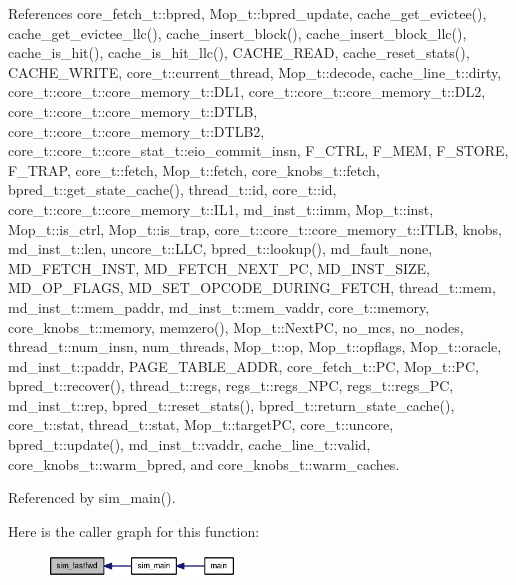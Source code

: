 References core\_\-fetch\_\-t::bpred, Mop\_\-t::bpred\_\-update, cache\_\-get\_\-evictee(), cache\_\-get\_\-evictee\_\-llc(), cache\_\-insert\_\-block(), cache\_\-insert\_\-block\_\-llc(), cache\_\-is\_\-hit(), cache\_\-is\_\-hit\_\-llc(), CACHE\_\-READ, cache\_\-reset\_\-stats(), CACHE\_\-WRITE, core\_\-t::current\_\-thread, Mop\_\-t::decode, cache\_\-line\_\-t::dirty, core\_\-t::core\_\-t::core\_\-memory\_\-t::DL1, core\_\-t::core\_\-t::core\_\-memory\_\-t::DL2, core\_\-t::core\_\-t::core\_\-memory\_\-t::DTLB, core\_\-t::core\_\-t::core\_\-memory\_\-t::DTLB2, core\_\-t::core\_\-t::core\_\-stat\_\-t::eio\_\-commit\_\-insn, F\_\-CTRL, F\_\-MEM, F\_\-STORE, F\_\-TRAP, core\_\-t::fetch, Mop\_\-t::fetch, core\_\-knobs\_\-t::fetch, bpred\_\-t::get\_\-state\_\-cache(), thread\_\-t::id, core\_\-t::id, core\_\-t::core\_\-t::core\_\-memory\_\-t::IL1, md\_\-inst\_\-t::imm, Mop\_\-t::inst, Mop\_\-t::is\_\-ctrl, Mop\_\-t::is\_\-trap, core\_\-t::core\_\-t::core\_\-memory\_\-t::ITLB, knobs, md\_\-inst\_\-t::len, uncore\_\-t::LLC, bpred\_\-t::lookup(), md\_\-fault\_\-none, MD\_\-FETCH\_\-INST, MD\_\-FETCH\_\-NEXT\_\-PC, MD\_\-INST\_\-SIZE, MD\_\-OP\_\-FLAGS, MD\_\-SET\_\-OPCODE\_\-DURING\_\-FETCH, thread\_\-t::mem, md\_\-inst\_\-t::mem\_\-paddr, md\_\-inst\_\-t::mem\_\-vaddr, core\_\-t::memory, core\_\-knobs\_\-t::memory, memzero(), Mop\_\-t::NextPC, no\_\-mcs, no\_\-nodes, thread\_\-t::num\_\-insn, num\_\-threads, Mop\_\-t::op, Mop\_\-t::opflags, Mop\_\-t::oracle, md\_\-inst\_\-t::paddr, PAGE\_\-TABLE\_\-ADDR, core\_\-fetch\_\-t::PC, Mop\_\-t::PC, bpred\_\-t::recover(), thread\_\-t::regs, regs\_\-t::regs\_\-NPC, regs\_\-t::regs\_\-PC, md\_\-inst\_\-t::rep, bpred\_\-t::reset\_\-stats(), bpred\_\-t::return\_\-state\_\-cache(), core\_\-t::stat, thread\_\-t::stat, Mop\_\-t::targetPC, core\_\-t::uncore, bpred\_\-t::update(), md\_\-inst\_\-t::vaddr, cache\_\-line\_\-t::valid, core\_\-knobs\_\-t::warm\_\-bpred, and core\_\-knobs\_\-t::warm\_\-caches.

Referenced by sim\_\-main().

Here is the caller graph for this function:\nopagebreak
\begin{figure}[H]
\begin{center}
\leavevmode
\includegraphics[width=141pt]{sim-zesto_8cpp_d4465337904f2c1d2b694eb41043de6e_icgraph}
\end{center}
\end{figure}
